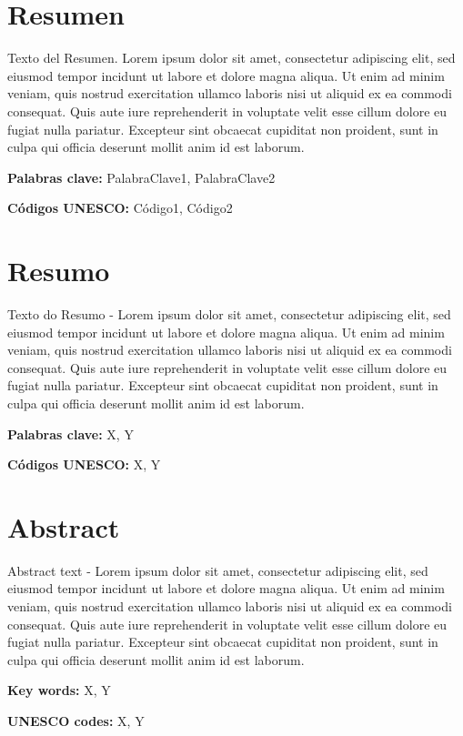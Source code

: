 %
\newpage
{}%
\chapter*{Resumen}
%
Texto del Resumen. Lorem ipsum dolor sit amet, consectetur adipiscing elit, sed eiusmod tempor incidunt ut labore et dolore magna aliqua. Ut enim ad minim veniam, quis nostrud exercitation ullamco laboris nisi ut aliquid ex ea commodi consequat. Quis aute iure reprehenderit in voluptate velit esse cillum dolore eu fugiat nulla pariatur. Excepteur sint obcaecat cupiditat non proident, sunt in culpa qui officia deserunt mollit anim id est laborum.
%
\par\textbf{Palabras clave:} PalabraClave1, PalabraClave2
\par\textbf{Códigos UNESCO:} Código1, Código2
%
%
\newpage
{}
{}
\chapter*{Resumo}
%
Texto do Resumo - Lorem ipsum dolor sit amet, consectetur adipiscing elit, sed eiusmod tempor incidunt ut labore et dolore magna aliqua. Ut enim ad minim veniam, quis nostrud exercitation ullamco laboris nisi ut aliquid ex ea commodi consequat. Quis aute iure reprehenderit in voluptate velit esse cillum dolore eu fugiat nulla pariatur. Excepteur sint obcaecat cupiditat non proident, sunt in culpa qui officia deserunt mollit anim id est laborum.
%
\par\textbf{Palabras clave:} X, Y
\par\textbf{Códigos UNESCO:} X, Y
%
%
%
\newpage
{}
{}
\chapter*{Abstract}
%
Abstract text - Lorem ipsum dolor sit amet, consectetur adipiscing elit, sed eiusmod tempor incidunt ut labore et dolore magna aliqua. Ut enim ad minim veniam, quis nostrud exercitation ullamco laboris nisi ut aliquid ex ea commodi consequat. Quis aute iure reprehenderit in voluptate velit esse cillum dolore eu fugiat nulla pariatur. Excepteur sint obcaecat cupiditat non proident, sunt in culpa qui officia deserunt mollit anim id est laborum.
%
\par\textbf{Key words:} X, Y
\par\textbf{UNESCO codes:} X, Y
%